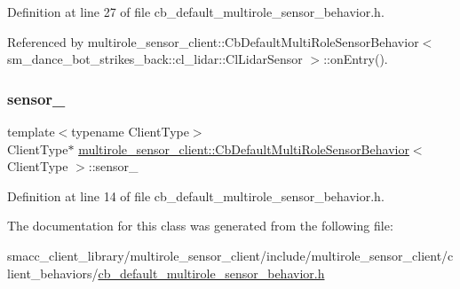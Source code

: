 Definition at line 27 of file cb\+\_\+default\+\_\+multirole\+\_\+sensor\+\_\+behavior.\+h.



Referenced by multirole\+\_\+sensor\+\_\+client\+::\+Cb\+Default\+Multi\+Role\+Sensor\+Behavior$<$ sm\+\_\+dance\+\_\+bot\+\_\+strikes\+\_\+back\+::cl\+\_\+lidar\+::\+Cl\+Lidar\+Sensor $>$\+::on\+Entry().

\mbox{\label{classmultirole__sensor__client_1_1CbDefaultMultiRoleSensorBehavior_a5e4e65ada73da49c2b8579b422b97d0d}} 
\subsubsection{\texorpdfstring{sensor\+\_\+}{sensor\_}}
{\footnotesize\ttfamily template$<$typename Client\+Type$>$ \\
Client\+Type$\ast$ \hyperlink{classmultirole__sensor__client_1_1CbDefaultMultiRoleSensorBehavior}{multirole\+\_\+sensor\+\_\+client\+::\+Cb\+Default\+Multi\+Role\+Sensor\+Behavior}$<$ Client\+Type $>$\+::sensor\+\_\+}



Definition at line 14 of file cb\+\_\+default\+\_\+multirole\+\_\+sensor\+\_\+behavior.\+h.



The documentation for this class was generated from the following file\+:\begin{DoxyCompactItemize}
\item 
smacc\+\_\+client\+\_\+library/multirole\+\_\+sensor\+\_\+client/include/multirole\+\_\+sensor\+\_\+client/client\+\_\+behaviors/\hyperlink{cb__default__multirole__sensor__behavior_8h}{cb\+\_\+default\+\_\+multirole\+\_\+sensor\+\_\+behavior.\+h}\end{DoxyCompactItemize}
